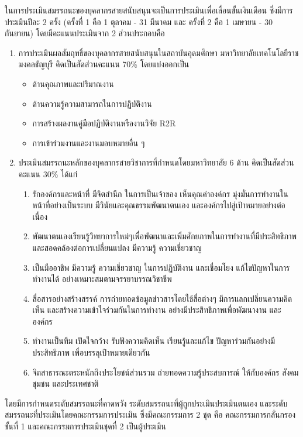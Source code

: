 ในการประเมินสมรรถนะของบุคลากรสายสนับสนุนจะเป็นการประเมินเพื่อเลื่อนขั้นเงินเดือน  ซึ่งมีการประเมินปีละ 2 ครั้ง (ครั้งที่ 1 คือ 1 ตุลาคม - 31 มีนาคม และ ครั้งที่ 2 คือ 1 เมษายน - 30 กันยายน)  โดยมีคะแนนประเมินจาก 2 ส่วนประกอบคือ 
\begin{enumerate}
\item การประเมินผลสัมฤทธิ์ของบุคลากรสายสนับสนุนในสถาบันอุดมศึกษา มหาวิทยาลัยเทคโนโลยีราชมงคลธัญบุรี คิดเป็นสัดส่วนคะแนน 70\% โดยแบ่งออกเป็น
\begin{itemize}
\item ด้านคุณภาพและปริมาณงาน
\item ด้านความรู้ความสามารถในการปฏิบัติงาน
\item การสร้างผลงานคู่มือปฏิบัติงานหรืองานวิจัย R2R
\item การเข้าร่วมงานและงานมอบหมายอื่น ๆ
\end{itemize}
\item ประเมินสมรรถนะหลักของบุคลากรสายวิชาการที่กำหนดโดยมหาวิทยาลัย 6 ด้าน คิดเป็นสัดส่วนคะแนน 30\% ได้แก่
\begin{enumerate}[label=(\arabic*),leftmargin=0.8cm, labelsep=2mm]
\item รักองค์กรและหน้าที่ มีจิตสำนึก ในการเป็นเจ้าของ เห็นคุณค่าองค์กร มุ่งมั่นการทำงานในหน้าที่อย่างเป็นระบบ มีวินัยและคุณธรรมพัฒนาตนเอง และองค์กรไปสู่เป้าหมายอย่างต่อเนื่อง
\item พัฒนาตนเองเรียนรู้วิทยาการใหม่ๆเพื่อพัฒนาและเพิ่มศักยภาพในการทำงานที่มีประสิทธิภาพและสอดคล้องต่อการเปลี่ยนแปลง มีความรู้ ความเชี่ยวชาญ
\item เป็นมืออาชีพ มีความรู้ ความเชี่ยวชาญ ในการปฏิบัติงาน และเชื่อมโยง แก้ไขปัญหาในการทำงานได้ อย่างเหมาะสมตามจรรยาบรรณวิชาชีพ
\item สื่อสารอย่างสร้างสรรค์ การถ่ายทอดข้อมูลข่าวสารโดยใช้สื่อต่างๆ มีการแลกเปลี่ยนความคิดเห็น และสร้างความเข้าใจร่วมกันในการทำงาน อย่างมีประสิทธิภาพเพื่อพัฒนางาน และองค์กร
\item ทำงานเป็นทีม เปิดใจกว้าง รับฟังความคิดเห็น เรียนรู้และแก้ไข ปัญหาร่วมกันอย่างมีประสิทธิภาพ เพื่อบรรลุเป้าหมายเดียวกัน
\item จิตสาธารณะตระหนักถึงประโยชน์ส่วนรวม ถ่ายทอดความรู้ประสบการณ์ ให้กับองค์กร สังคมชุมชน และประเทศชาติ
\end{enumerate}
\end{enumerate}

โดยมีการกำหนดระดับสมรรถนะที่คาดหวัง ระดับสมรรถนะที่ผู้ถูกประเมินประเมินตนเอง และระดับสมรรถนะที่ประเมินโดยคณะกรรมการประเมิน ซึ่งมีคณะกรรมการ 2 ชุด คือ คณะกรรมการกลั่นกรองขั้นที่ 1 และคณะกรรมการประเมินชุดที่ 2 เป็นผู้ประเมิน
 
